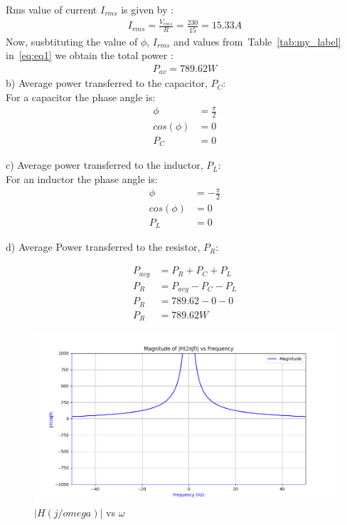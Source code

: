 \documentclass[journal,12pt,onecolumn]{IEEEtran}
\newcommand\tabref{Table~\ref}
\theoremstyle{remark}
\providecommand{\abs}[1]{\left\vert#1\right\vert}
\begin{document}
Rms value of current $I_{rms}$ is given by  :
\begin{align}
	I_{rms}=\frac{V_{rms}}{R}=\frac{230}{15}=15.33A
\end{align}
Now, susbtituting the value of $\phi$, $I_{rms}$ and values from~\tabref{tab:my_label} in~\eqref{eq:eq1} we obtain the total power :
\begin{align}
	P_{av}=789.62 W
\end{align}
b) Average power transferred to the capacitor, $P_C$:\\
For a capacitor the phase angle is:
\begin{align}
	\phi &= \frac{\pi}{2}\\
	cos(\phi) &= 0\\
	P_C &= 0
\end{align}	  

c) Average power transferred to the inductor, $P_L$:\\
For an inductor the phase angle is:
\begin{align}
	\phi &= -\frac{\pi}{2}\\
	cos(\phi) &= 0\\
	P_L &= 0
\end{align}	 

d) Average Power transferred to the resistor, $P_R$:

\begin{align}
	P_{avg} &= P_{R} + P_{C} + P_{L}\\
	P_{R} &= P_{avg} - P_{C} - P_{L}\\
	P_{R} &= 789.62 -0-0\\
	P_R &= 789.62W
\end{align}

\newpage
\begin{figure}[!h]
	\centering
	\includegraphics[width=\columnwidth]{figs/rmagnitude.png}
	\caption{$\abs{H(j/omega)}$ vs $\omega$}
	\label{fig:magnitude_plot}
\end{figure}
\end{document}
